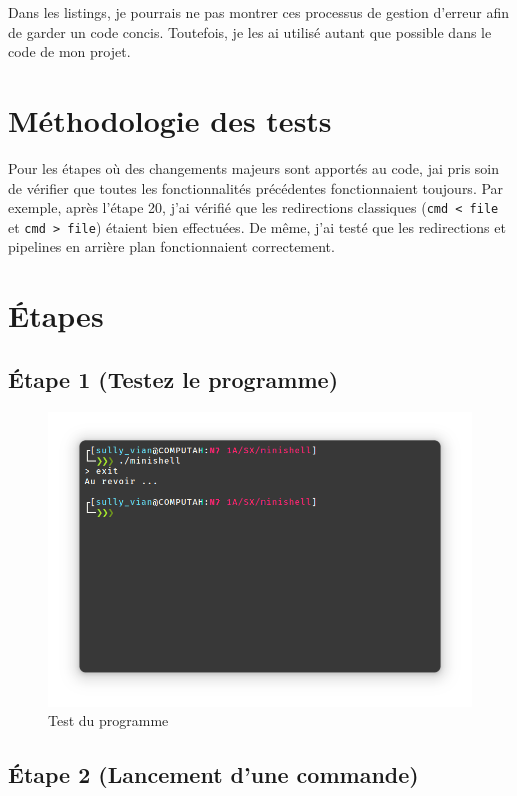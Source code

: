 \documentclass{article}
\begin{document}
Dans les listings, je pourrais ne pas montrer ces processus de gestion d'erreur afin de garder un code concis. Toutefois, je les ai utilisé autant que possible dans le code de mon projet.

\section{Méthodologie des tests}

Pour les étapes où des changements majeurs sont apportés au code, jai pris soin de vérifier que toutes les fonctionnalités précédentes fonctionnaient toujours. Par exemple, après l'étape 20, j'ai vérifié que les redirections classiques (\texttt{cmd < file} et \texttt{cmd > file}) étaient bien effectuées. De même, j'ai testé que les redirections et pipelines en arrière plan fonctionnaient correctement.

\section{Étapes}

\subsection*{Étape 1 (Testez le programme)}

\begin{figure}[H]
    \centering
    \includegraphics[width=1\textwidth]{./resources/E1.png}
    \caption{Test du programme}
\end{figure}

\subsection*{Étape 2 (Lancement d'une commande)}
\end{document}
